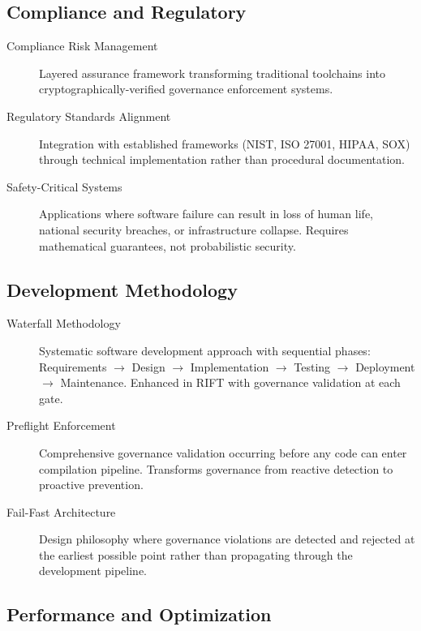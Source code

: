 \subsection*{Compliance and Regulatory}

\begin{description}
\item[Compliance Risk Management] Layered assurance framework transforming traditional toolchains into cryptographically-verified governance enforcement systems.

\item[Regulatory Standards Alignment] Integration with established frameworks (NIST, ISO 27001, HIPAA, SOX) through technical implementation rather than procedural documentation.

\item[Safety-Critical Systems] Applications where software failure can result in loss of human life, national security breaches, or infrastructure collapse. Requires mathematical guarantees, not probabilistic security.
\end{description}

\subsection*{Development Methodology}

\begin{description}
\item[Waterfall Methodology] Systematic software development approach with sequential phases: Requirements $\rightarrow$ Design $\rightarrow$ Implementation $\rightarrow$ Testing $\rightarrow$ Deployment $\rightarrow$ Maintenance. Enhanced in RIFT with governance validation at each gate.

\item[Preflight Enforcement] Comprehensive governance validation occurring before any code can enter compilation pipeline. Transforms governance from reactive detection to proactive prevention.

\item[Fail-Fast Architecture] Design philosophy where governance violations are detected and rejected at the earliest possible point rather than propagating through the development pipeline.
\end{description}

\subsection*{Performance and Optimization}

